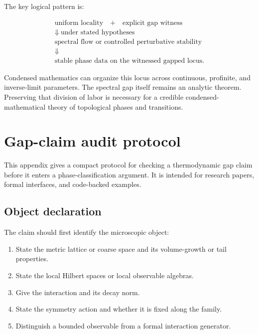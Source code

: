 \documentclass[12pt]{article}
\theoremstyle{definition}
\theoremstyle{remark}
\begin{document}
The key logical pattern is:

\[
\boxed{
\begin{array}{c}
\text{uniform locality}
\quad+\quad
\text{explicit gap witness}
\\[4pt]
\Downarrow\ \text{under stated hypotheses}
\\[4pt]
\text{spectral flow or controlled perturbative stability}
\\[4pt]
\Downarrow
\\[4pt]
\text{stable phase data on the witnessed gapped locus.}
\end{array}}
\]

Condensed mathematics can organize this locus across continuous, profinite,
and inverse-limit parameters. The spectral gap itself remains an analytic
theorem. Preserving that division of labor is necessary for a credible
condensed-mathematical theory of topological phases and transitions.

\appendix

\section{Gap-claim audit protocol}

This appendix gives a compact protocol for checking a thermodynamic gap claim
before it enters a phase-classification argument. It is intended for research
papers, formal interfaces, and code-backed examples.

\subsection{Object declaration}

The claim should first identify the microscopic object:

\begin{enumerate}[label=\textbf{O\arabic*.}]
  \item State the metric lattice or coarse space and its volume-growth or tail
  properties.
  \item State the local Hilbert spaces or local observable algebras.
  \item Give the interaction and its decay norm.
  \item State the symmetry action and whether it is fixed along the family.
  \item Distinguish a bounded observable from a formal interaction generator.
\end{enumerate}
\end{document}
